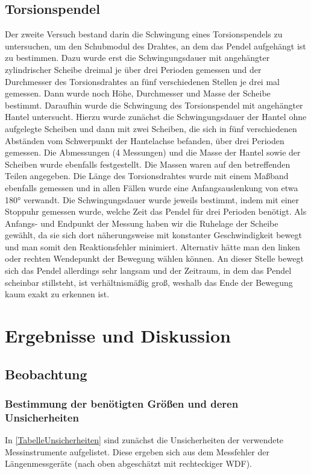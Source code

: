 \documentclass[
	a4paper,
	12pt,
	pagesize,
	ngerman
]{scrartcl}
\begin{document}
	\subsection{Torsionspendel}
	Der zweite Versuch bestand darin die Schwingung eines Torsionspendels zu untersuchen, um den Schubmodul des Drahtes, an dem das Pendel aufgehängt ist zu bestimmen.
	Dazu wurde erst die Schwingungsdauer mit angehängter zylindrischer Scheibe dreimal je über drei Perioden gemessen und der Durchmesser des Torsionsdrahtes an fünf verschiedenen Stellen je drei mal gemessen. Dann wurde noch Höhe, Durchmesser und Masse der Scheibe bestimmt.
	Daraufhin wurde die Schwingung des Torsionspendel mit angehängter Hantel untersucht. Hierzu wurde zunächst die Schwingungsdauer der Hantel ohne aufgelegte Scheiben und dann mit zwei Scheiben, die sich in fünf verschiedenen Abständen vom Schwerpunkt der Hantelachse befanden, über drei Perioden gemessen. Die Abmessungen (4 Messungen) und die Masse der Hantel sowie der Scheiben wurde ebenfalls festgestellt. Die Massen waren auf den betreffenden Teilen angegeben.
	Die Länge des Torsionsdrahtes wurde mit einem Maßband ebenfalls gemessen und in allen Fällen wurde eine Anfangsauslenkung von etwa 180° verwandt. Die Schwingungsdauer wurde jeweils bestimmt, indem mit einer Stoppuhr gemessen wurde, welche Zeit das Pendel für drei Perioden benötigt. Als Anfangs- und Endpunkt der Messung haben wir die Ruhelage der Scheibe gewählt, da sie sich dort näherungsweise mit konstanter Geschwindigkeit bewegt und man somit den Reaktionsfehler minimiert.
	Alternativ hätte man den linken oder rechten Wendepunkt der Bewegung wählen können. An dieser Stelle bewegt sich das Pendel allerdings sehr langsam und der Zeitraum, in dem das Pendel scheinbar stillsteht, ist verhältnismäßig groß, weshalb das Ende der Bewegung kaum exakt zu erkennen ist.
	
	\section{Ergebnisse und Diskussion}

	\subsection{Beobachtung}

	\subsubsection{Bestimmung der benötigten Größen und deren Unsicherheiten} 
	In \cref{TabelleUnsicherheiten} sind zunächst die Unsicherheiten der verwendete Messinstrumente aufgelistet. Diese ergeben sich aus dem Messfehler der Längenmessgeräte (nach oben abgeschätzt mit rechteckiger WDF). %
\end{document}
